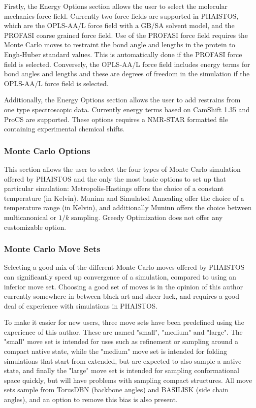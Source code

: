 Firstly, the Energy Options section allows the user to select the molecular mechanics force field.
Currently two force fields are supported in PHAISTOS, which are the OPLS-AA/L force field with a GB/SA solvent model, and the PROFASI coarse grained force field.
Use of the PROFASI force field requires the Monte Carlo moves to restraint the bond angle and lengths in the protein to Engh-Huber standard values.
This is automatically done if the PROFASI force field is selected. 
Conversely, the OPLS-AA/L force field includes energy terms for bond angles and lengths and these are degrees of freedom in the simulation if the OPLS-AA/L force field is selected.

Additionally, the Energy Options section allows the user to add restrains from one type spectroscopic data.
Currently energy terms based on CamShift 1.35 and ProCS are supported.
These options requires a NMR-STAR formatted file containing experimental chemical shifts.


\subsubsection{Monte Carlo Options}

This section allows the user to select the four types of Monte Carlo simulation offered by PHAISTOS and the only the most basic options to set up that particular simulation:
Metropolis-Hastings offers the choice of a constant temperature (in Kelvin).
Muninn and Simulated Annealing offer the choice of a temperature range (in Kelvin), and additionally Muninn offers the choice between multicanonical or $1/k$ sampling.
Greedy Optimization does not offer any customizable option. 

\subsubsection{Monte Carlo Move Sets}

Selecting a good mix of the different Monte Carlo moves offered by PHAISTOS can significantly speed up convergence of a simulation, compared to using an inferior move set.
Choosing a good set of moves is in the opinion of this author currently somewhere in between black art and sheer luck, and requires a good deal of experience with simulations in PHAISTOS.

To make it easier for new users, three move sets have been predefined using the experience of this author.
These are named "small", "medium" and "large".
The "small" move set is intended for uses such as refinement or sampling around a compact native state, 
while the "medium" move set is intended for folding simulations that start from extended, but are expected to also sample a native state, 
and finally the "large" move set is intended for sampling conformational space quickly, but will have problems with sampling compact structures.
All move sets sample from TorusDBN (backbone angles) and BASILISK (side chain angles), and an option to remove this bias is also present.

